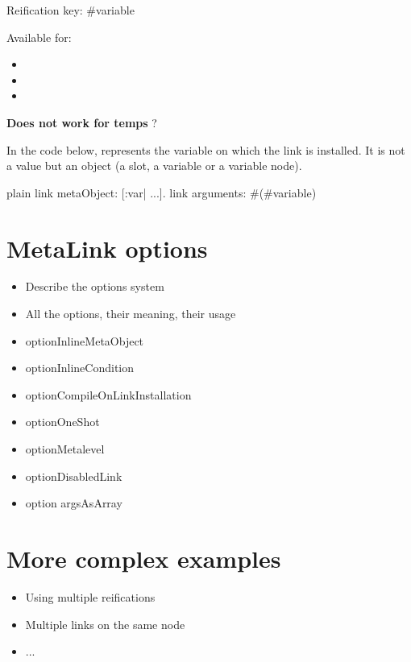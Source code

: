 \documentclass[10pt,twoside,english]{_support/latex/sbabook/sbabook}
\begin{document}
Reification key: \#variable

Available for:

\begin{itemize}
\item {}
\item {}
\item {}
\end{itemize}

\textbf{Does not work for temps} ?

In the code below,  represents the variable on which the link is installed. It is not a value but an object (a slot, a variable or a variable node). 

\begin{displaycode}{plain}
link metaObject: [:var| ...].
link arguments: #(#variable)
\end{displaycode}
\section{MetaLink options}
\begin{itemize}
\item Describe the options system
\item All the options, their meaning, their usage
\end{itemize}

\begin{itemize}
\item optionInlineMetaObject
\item optionInlineCondition
\item optionCompileOnLinkInstallation
\item optionOneShot
\item optionMetalevel
\item optionDisabledLink
\item option argsAsArray
\end{itemize}
\section{More complex examples}
\begin{itemize}
\item Using multiple reifications
\item Multiple links on the same node
\item ...
\end{itemize}


\backmatter

\end{document}
